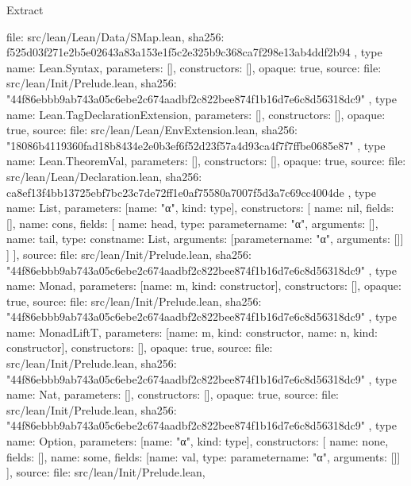\begin{lexlean}{Extract}
\begin{toolingmodule}
{{{        file: src/lean/Lean/Data/SMap.lean,
        sha256: f525d03f271e2b5e02643a83a153e1f5c2e325b9c368ca7f298e13ab4ddf2b94
      }
    },
    type{
      name: Lean.Syntax,
      parameters: [],
      constructors: [],
      opaque: true,
      source: {
        file: src/lean/Init/Prelude.lean,
        sha256: "44f86ebbb9ab743a05c6ebe2c674aadbf2c822bee874f1b16d7e6c8d56318dc9"
      }
    },
    type{
      name: Lean.TagDeclarationExtension,
      parameters: [],
      constructors: [],
      opaque: true,
      source: {
        file: src/lean/Lean/EnvExtension.lean,
        sha256: "18086b4119360fad18b8434e2e0b3ef6f52d23f57a4d93ca4f7f7ffbe0685e87"
      }
    },
    type{
      name: Lean.TheoremVal,
      parameters: [],
      constructors: [],
      opaque: true,
      source: {
        file: src/lean/Lean/Declaration.lean,
        sha256: ca8ef13f4bb13725ebf7bc23c7de72ff1e0af75580a7007f5d3a7c69cc4004de
      }
    },
    type{
      name: List,
      parameters: [{name: "α", kind: type{}}],
      constructors: [
        {name: nil, fields: []},
        {
          name: cons,
          fields: [
            {name: head, type: parameter{name: "α", arguments: []}},
            {name: tail, type: const{name: List, arguments: [parameter{name: "α", arguments: []}]}}
          ]
        }
      ],
      source: {
        file: src/lean/Init/Prelude.lean,
        sha256: "44f86ebbb9ab743a05c6ebe2c674aadbf2c822bee874f1b16d7e6c8d56318dc9"
      }
    },
    type{
      name: Monad,
      parameters: [{name: m, kind: constructor{}}],
      constructors: [],
      opaque: true,
      source: {
        file: src/lean/Init/Prelude.lean,
        sha256: "44f86ebbb9ab743a05c6ebe2c674aadbf2c822bee874f1b16d7e6c8d56318dc9"
      }
    },
    type{
      name: MonadLiftT,
      parameters: [{name: m, kind: constructor{}}, {name: n, kind: constructor{}}],
      constructors: [],
      opaque: true,
      source: {
        file: src/lean/Init/Prelude.lean,
        sha256: "44f86ebbb9ab743a05c6ebe2c674aadbf2c822bee874f1b16d7e6c8d56318dc9"
      }
    },
    type{
      name: Nat,
      parameters: [],
      constructors: [],
      opaque: true,
      source: {
        file: src/lean/Init/Prelude.lean,
        sha256: "44f86ebbb9ab743a05c6ebe2c674aadbf2c822bee874f1b16d7e6c8d56318dc9"
      }
    },
    type{
      name: Option,
      parameters: [{name: "α", kind: type{}}],
      constructors: [
        {name: none, fields: []},
        {name: some, fields: [{name: val, type: parameter{name: "α", arguments: []}}]}
      ],
      source: {
        file: src/lean/Init/Prelude.lean,
}}}
\end{toolingmodule}
\end{lexlean}

